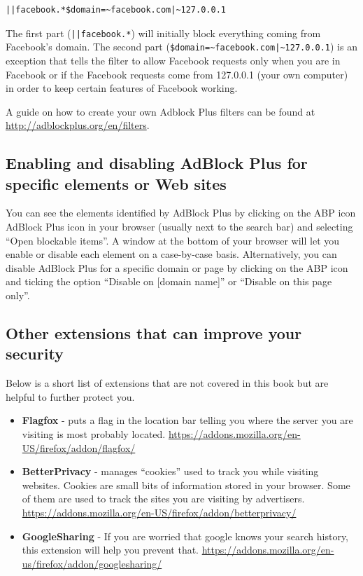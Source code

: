 \begin{verbatim}
||facebook.*$domain=~facebook.com|~127.0.0.1
\end{verbatim}
The first part (\verb!||facebook.*!) will initially block everything
coming from Facebook's domain. The second part
(\verb!$domain=~facebook.com|~127.0.0.1!) is an exception that tells the
filter to allow Facebook requests only when you are in Facebook or if
the Facebook requests come from 127.0.0.1 (your own computer) in order
to keep certain features of Facebook working.

A guide on how to create your own Adblock Plus filters can be found at
\href{http://adblockplus.org/en/filters}{http://adblockplus.org/en/filters}.

\subsection{Enabling and disabling AdBlock Plus for specific elements or
Web sites}

You can see the elements identified by AdBlock Plus by clicking on the
ABP icon AdBlock Plus icon in your browser (usually next to the search
bar) and selecting ``Open blockable items''. A window at the bottom of
your browser will let you enable or disable each element on a
case-by-case basis. Alternatively, you can disable AdBlock Plus for a
specific domain or page by clicking on the ABP icon and ticking the
option ``Disable on {[}domain name{]}'' or ``Disable on this page
only''.

\subsection{Other extensions that can improve your security}

Below is a short list of extensions that are not covered in this book
but are helpful to further protect you.

\begin{itemize}
\item
  \textbf{Flagfox} - puts a flag in the location bar telling you where
  the server you are visiting is most probably located.
  \href{https://addons.mozilla.org/en-US/firefox/addon/flagfox/}{https://addons.mozilla.org/en-US/firefox/addon/flagfox/}
\item
  \textbf{BetterPrivacy} - manages ``cookies'' used to track you while
  visiting websites. Cookies are small bits of information stored in
  your browser. Some of them are used to track the sites you are
  visiting by advertisers.
  \href{https://addons.mozilla.org/en-US/firefox/addon/betterprivacy/}{https://addons.mozilla.org/en-US/firefox/addon/betterprivacy/}
\item
  \textbf{GoogleSharing} - If you are worried that google knows your
  search history, this extension will help you prevent that.
  \href{https://addons.mozilla.org/en-us/firefox/addon/googlesharing/}{https://addons.mozilla.org/en-us/firefox/addon/googlesharing/}
\end{itemize}
